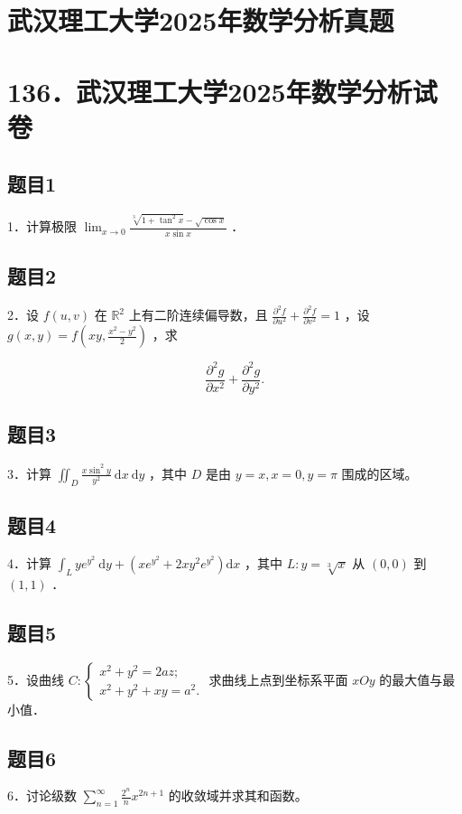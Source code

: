 \documentclass{article}
\begin{document}
\section*{武汉理工大学2025年数学分析真题}
\section*{136．武汉理工大学2025年数学分析试卷}

\subsection{题目1}
1．计算极限 \(\lim _{x \rightarrow 0} \frac{\sqrt[3]{1+\tan ^{2} x}-\sqrt{\cos x}}{x \sin x}\) ．

\subsection{题目2}
2．设 \(f(u, v)\) 在 \(\mathbb{R}^{2}\) 上有二阶连续偏导数，且 \(\frac{\partial^{2} f}{\partial u^{2}}+\frac{\partial^{2} f}{\partial v^{2}}=1\) ，设 \(g(x, y)=f\left(x y, \frac{x^{2}-y^{2}}{2}\right)\) ，求

\[
\frac{\partial^{2} g}{\partial x^{2}}+\frac{\partial^{2} g}{\partial y^{2}} .
\]

\subsection{题目3}
3．计算 \(\iint_{D} \frac{x \sin ^{2} y}{y^{2}} \mathrm{~d} x \mathrm{~d} y\) ，其中 \(D\) 是由 \(y=x, x=0, y=\pi\) 围成的区域。

\subsection{题目4}
4．计算 \(\int_{L} y e^{y^{2}} \mathrm{~d} y+\left(x e^{y^{2}}+2 x y^{2} e^{y^{2}}\right) \mathrm{d} x\) ，其中 \(L: y=\sqrt[3]{x}\) 从 \((0,0)\) 到 \((1,1)\) ．

\subsection{题目5}
5．设曲线 \(C:\left\{\begin{array}{l}x^{2}+y^{2}=2 a z ; \\ x^{2}+y^{2}+x y=a^{2} .\end{array}\right.\) 求曲线上点到坐标系平面 \(x O y\) 的最大值与最小值．

\subsection{题目6}
6．讨论级数 \(\sum_{n=1}^{\infty} \frac{2^{n}}{n} x^{2 n+1}\) 的收敛域并求其和函数。
\end{document}
